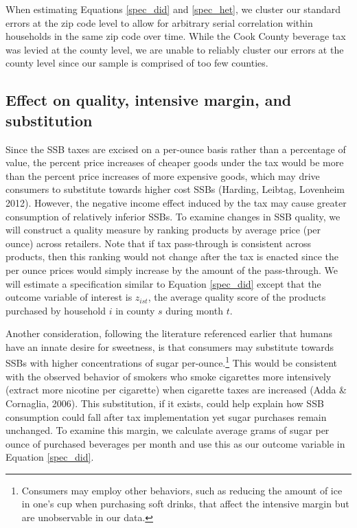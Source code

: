 \documentclass[12pt]{article}
\begin{document}
When estimating Equations \ref{spec_did} and \ref{spec_het}, we cluster our standard errors at the zip code level to allow for arbitrary serial correlation within households in the same zip code over time. While the Cook County beverage tax was levied at the county level, we are unable to reliably cluster our errors at the county level since our sample is comprised of too few counties.

\subsection{Effect on quality, intensive margin, and substitution}

Since the SSB taxes are excised on a per-ounce basis rather than a percentage of value, the percent price increases of cheaper goods under the tax would be more than the percent price increases of more expensive goods, which may drive consumers to substitute towards higher cost SSBs (Harding, Leibtag, Lovenheim 2012). However, the negative income effect induced by the tax may cause greater consumption of relatively inferior SSBs. To examine changes in SSB quality, we will construct a quality measure by ranking products by average price (per ounce) across retailers. Note that if tax pass-through is consistent across products, then this ranking would not change after the tax is enacted since the per ounce prices would simply increase by the amount of the pass-through. We will estimate a specification similar to Equation \ref{spec_did} except that the outcome variable of interest is $z_{ist}$, the average quality score of the products purchased by household $i$ in county $s$ during month $t$.

Another consideration, following the literature referenced earlier that humans have an innate desire for sweetness, is that consumers may substitute towards SSBs with higher concentrations of sugar per-ounce.\footnote{Consumers may employ other behaviors, such as reducing the amount of ice in one's cup when purchasing soft drinks, that affect the intensive margin but are unobservable in our data.} This would be consistent with the observed behavior of smokers who smoke cigarettes more intensively (extract more nicotine per cigarette) when cigarette taxes are increased (Adda \& Cornaglia, 2006). This substitution, if it exists, could help explain how SSB consumption could fall after tax implementation yet sugar purchases remain unchanged. To examine this margin, we calculate average grams of sugar per ounce of purchased beverages per month and use this as our outcome variable in Equation \ref{spec_did}.
\end{document}
